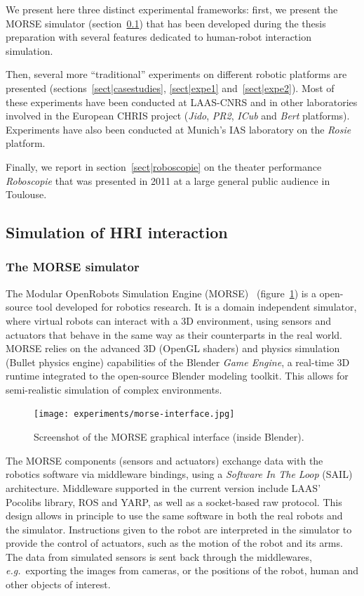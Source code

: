 We present here three distinct experimental frameworks: first, we present the
MORSE simulator (section~\ref{sect|simulation}) that has been developed during
the thesis preparation with several features dedicated to human-robot
interaction simulation.

Then, several more ``traditional'' experiments on different robotic platforms
are presented (sections~\ref{sect|casestudies}, \ref{sect|expe1}
and~\ref{sect|expe2}). Most of these experiments have been conducted at
LAAS-CNRS and in other laboratories involved in the European CHRIS project
(\emph{Jido}, \emph{PR2}, \emph{ICub} and \emph{Bert} platforms).  Experiments
have also been conducted at Munich's IAS laboratory on the \emph{Rosie}
platform.

Finally, we report in section~\ref{sect|roboscopie} on the theater performance
\emph{Roboscopie} that was presented in 2011 at a large general public audience
in Toulouse.

\subsection{Simulation of HRI interaction}
\label{sect|simulation}

\subsubsection{The MORSE simulator}

The Modular OpenRobots Simulation Engine (MORSE)~\cite{Echeverria2011}
(figure~\ref{fig|morse-gui}) is a open-source tool developed for robotics
research. It is a domain independent simulator, where virtual robots can
interact with a 3D environment, using sensors and actuators that behave in the
same way as their counterparts in the real world.  MORSE relies on the advanced
3D (OpenGL shaders) and physics simulation ({\sc Bullet} physics engine)
capabilities of the Blender \emph{Game Engine}, a real-time 3D runtime
integrated to the open-source Blender modeling toolkit.  This allows for
semi-realistic simulation of complex environments.

\begin{figure}[t]
      \centering
      \texttt{[image: experiments/morse-interface.jpg]}
      \caption{Screenshot of the MORSE graphical interface (inside Blender).}
      \label{fig|morse-gui}
\end{figure}


The MORSE components (sensors and actuators) exchange data with the robotics
software via middleware bindings, using a \emph{Software In The Loop} (SAIL)
architecture. Middleware supported in the current version include LAAS'
Pocolibs library, ROS and YARP, as well as a socket-based raw protocol. This
design allows in principle to use the same software in both the real robots and
the simulator. Instructions given to the robot are interpreted in the simulator
to provide the control of actuators, such as the motion of the robot and its
arms.  The data from simulated sensors is sent back through the middlewares,
{\it e.g.}~exporting the images from cameras, or the positions of the robot,
human and other objects of interest.

